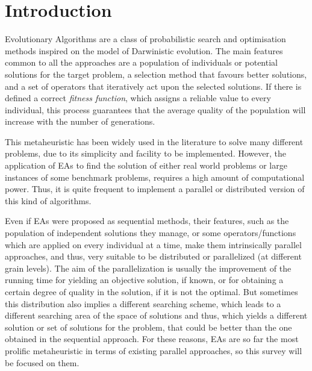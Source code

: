 \documentclass{article}
\begin{document}
%


\section{Introduction}
\label{sec:intro}
 
Evolutionary Algorithms \cite{EAs_Back96} are a class of probabilistic search and optimisation methods inspired on the model of Darwinistic evolution. 
The main features common to all the approaches are a population of individuals or potential solutions for the target problem, a selection method that favours better solutions, and a set of operators that iteratively act upon the selected solutions. If there is defined a correct {\em fitness function}, which assigns a reliable value to every individual, this process guarantees that the average quality of the population will increase with the number of generations.

This metaheuristic has been widely used in the literature to solve many different problems, due to its simplicity and facility to be implemented. However, the application of EAs to find the solution of either real world problems or large instances of some benchmark problems, requires a high amount of computational power. Thus, it is quite frequent to implement a parallel or distributed version of this kind of algorithms. 

Even if EAs were proposed as sequential methods, their features, such as the population of independent solutions they manage, or some operators/functions which are applied on every individual at a time, make them intrinsically parallel approaches, and thus, very suitable to be distributed or parallelized (at different grain levels).
The aim of the parallelization is usually the improvement of the running time for yielding an objective solution, if known, or for obtaining a certain degree of quality in the solution, if it is not the optimal. But sometimes this distribution also implies a different searching scheme, which leads to a different searching area of the space of solutions and thus, which yields a different solution or set of solutions for the problem, that could be better than the one obtained in the sequential approach.
For these reasons, EAs are so far the most prolific metaheuristic in
terms of existing parallel approaches, so this survey will be focused on them. 
\end{document}
